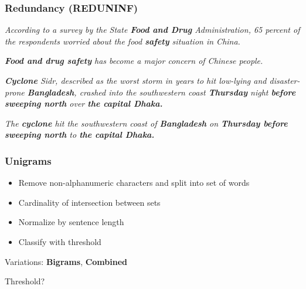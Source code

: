 \documentclass[table]{beamer}
\begin{document}
\begin{frame}
  \frametitle{Redundancy (REDUNINF)}
  \textit{According to a survey by the State \textbf{Food and Drug} Administration, 65 percent of the respondents worried about the food \textbf{safety} situation in China.}
  \vspace{0.1cm}

  \textit{\textbf{Food and drug safety} has become a major concern of Chinese people.}
  \vspace{0.25cm}
  \hline
  \vspace{0.25cm}

  \textit{\textbf{Cyclone} Sidr, described as the worst storm in years to hit low-lying and disaster-prone \textbf{Bangladesh}, crashed into the southwestern coast \textbf{Thursday} night \textbf{before sweeping north} over \textbf{the capital Dhaka.}}
  \vspace{0.1cm}

  \textit{The \textbf{cyclone} hit the southwestern coast of \textbf{Bangladesh} on \textbf{Thursday before sweeping north} to \textbf{the capital Dhaka.}}
\end{frame}

\begin{frame}
  \frametitle{\textbf{Unigrams}}
  \begin{center}
  \end{center}\pause

  \begin{itemize}
    \item Remove non-alphanumeric characters and split into set of words\pause
    \item Cardinality of intersection between sets\pause
    \item Normalize by sentence length\pause
    \item Classify with threshold\pause
  \end{itemize}

  Variations: \textbf{Bigrams}, \textbf{Combined}

  \vspace{0.5cm}
  Threshold?
\end{frame}
\end{document}
